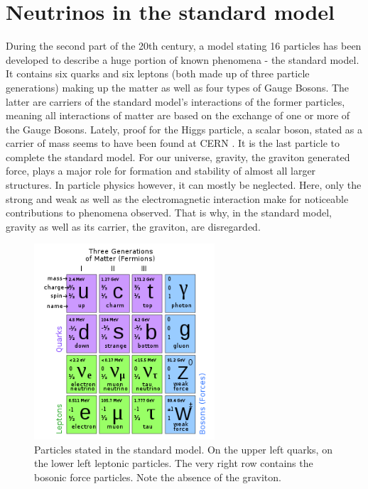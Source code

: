     \section{Neutrinos in the standard model}
    \label{ch:Introduction:sec:Neutrinos in the standard model}
    During the second part of the 20th century, a model stating 16 particles has been developed to describe a huge portion of known phenomena - the standard model. It contains six quarks and six leptons (both made up of three particle generations) making up the matter as well as four types of Gauge Bosons. The latter are carriers of the standard model's interactions of the former particles, meaning all interactions of matter are based on the exchange of one or more of the Gauge Bosons.
    Lately, proof for the Higgs particle, a scalar boson, stated as a carrier of mass seems to have been found at CERN \cite{CMS, ATLAS}. It is the last particle to complete the standard model.
    For our universe, gravity, the graviton generated force, plays a major role for formation and stability of almost all larger structures. In particle physics however, it can mostly be neglected. Here, only the strong and weak as well as the electromagnetic interaction make for noticeable contributions to phenomena observed. That is why, in the standard model, gravity as well as its carrier, the graviton, are disregarded.
    \begin{figure}
    	\centering
    	\includegraphics[width = 0.6\textwidth]{graphics/standardModel/particles.png}
    	\caption[standard model particles]{Particles stated in the standard model. On the upper left quarks, on the lower left leptonic particles. The very right row contains the bosonic force particles. Note the absence of the graviton.\cite{particlesSM}}
    	\label{fig:standardModel:particles}
    \end{figure}
	
